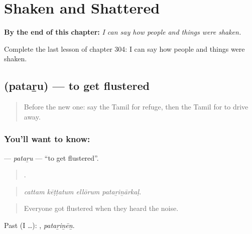 
\chapter{Shaken and Shattered}
\label{ch:ta-shaken-and-shattered}

\begin{chapteropening}
\textbf{By the end of this chapter:} \emph{I can say how people and things were shaken.}

Complete the last lesson of chapter 304: I can say how people and things were shaken.
\end{chapteropening}

\section[\texorpdfstring{\ta{பதறு} (pataṟu)}{பதறு (pataṟu)}]{ (pataṟu) — to get flustered}

\label{lesson:TA-C304-pataru}



\begin{quote}
Before the new one: say the Tamil for refuge, then the Tamil for to drive away.
\end{quote}

\subsection*{You'll want to know: }
\textbf{} — \emph{pataṟu} — \textquotedblleft{}to get flustered\textquotedblright{}.

\begin{quote}
   .
\end{quote}

\begin{quote}
\emph{cattam kēṭṭatum ellōrum pataṟiṉārkaḷ.}
\end{quote}

\begin{quote}
Everyone got flustered when they heard the noise.
\end{quote}

Past (I …): , \emph{pataṟiṉēṉ}.


